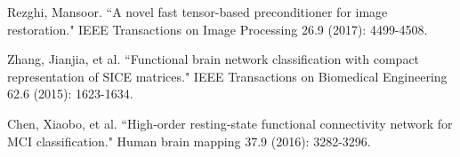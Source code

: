 \begin{thebibliography}{1}
	
		Rezghi, Mansoor. ``A novel fast tensor-based preconditioner for image restoration." IEEE Transactions on Image Processing 26.9 (2017): 4499-4508.
		
		
	Zhang, Jianjia, et al. ``Functional brain network classification with compact representation of SICE matrices." IEEE Transactions on Biomedical Engineering 62.6 (2015): 1623-1634.
	
	Chen, Xiaobo, et al. ``High‐order resting‐state functional connectivity network for MCI classification." Human brain mapping 37.9 (2016): 3282-3296.
		
%		
		
		
		
		
		
		
		
		
		
		
		
		
		
		
		
		
		
		
		

		
		
		
		
%		
		

\end{thebibliography}
